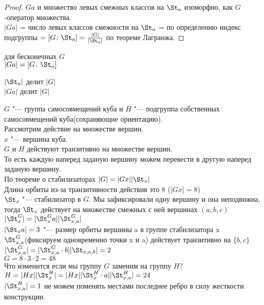 \begin{proof}
$Ga$ и множество левых смежных классов на $\St_a$ изоморфно, как $G$-оператор
множества.\\
$|Ga|$ = число левых классов смежности на $\St_a$ = по определению индекс подгруппы
$= [G \colon \St_a] = \frac{|G|}{|\St_a|}$ по теореме Лагранжа.
\end{proof}
\begin{Rem}
для бесконечных $G$\\
$|Ga| = [G \colon \St_a]$\\
\end{Rem}
\begin{conseq}
$|\St_a|$ делит $|G|$\\
$|Ga|$ делит $|G|$\\
\end{conseq}
\begin{exmp}
$G$ "--- группа самосовмещений куба и $H$ "--- подгруппа собственных самосовмещений куба(сохраняющие ориентацию).\\
Рассмотрим действие на множестве вершин.\\
$x$ "--- вершина куба.\\
$G$ и $H$ действуют транзитивно на множестве вершин.\\
То есть каждую наперед заданую вершину можем перевести в другую наперед заданую вершину.\\
По теореме о стабилизаторах $|G| = |Gx||\St_x|$\\
Длина орбиты из-за транзитивности действия это 8 ($|Gx| = 8$)\\
$\St_x$ "--- стабилизатор в $G$. Мы зафиксировали одну вершину и она неподвижна, тогда
$\St_x$ действует на множестве смежных с ней вершинах $(a, b, c)$\\
$|\St_x^{G}| = |\St_x^{G}a||\St_{x, a}^{G}|$\\
$|\St_x a| = 3$ "--- размер орбиты вершины a в группе стабилизатора x\\
$\St_{x, a}^{G}$(фиксируем одновременно точки x и a) действует транзитивно на $\{b, c\}$\\
$|\St_{x, a}^{G}| = |\St_{x, a}^{G}\cdot b||\St_{x, a, b}| = 2$\\
$G = 8 \cdot 3 \cdot 2 = 48$\\
Что изменится если мы группу $G$ заменим на группу $H$?
$H = |Hx||\St_x^{H}| = |Hx||\St_x^{H}\cdot a||\St_{x,a}^{H}| = 24$\\
$|\St_{x,a}^{H}| = 1$ не можем поменять местами последнее ребро в силу жесткости конструкции. 
\end{exmp}
